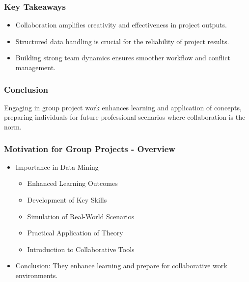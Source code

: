 \documentclass[aspectratio=169]{beamer}
\begin{document}
\begin{frame}[fragile]
    \frametitle{Key Takeaways}
    \begin{itemize}
        \item Collaboration amplifies creativity and effectiveness in project outputs.
        \item Structured data handling is crucial for the reliability of project results.
        \item Building strong team dynamics ensures smoother workflow and conflict management.
    \end{itemize}
\end{frame}

\begin{frame}[fragile]
    \frametitle{Conclusion}
    Engaging in group project work enhances learning and application of concepts, preparing individuals for future professional scenarios where collaboration is the norm.
\end{frame}

\begin{frame}[fragile]
    \frametitle{Motivation for Group Projects - Overview}
    \begin{itemize}
        \item Importance in Data Mining
        \begin{itemize}
            \item Enhanced Learning Outcomes
            \item Development of Key Skills
            \item Simulation of Real-World Scenarios
            \item Practical Application of Theory
            \item Introduction to Collaborative Tools
        \end{itemize}
        \item Conclusion: They enhance learning and prepare for collaborative work environments.
    \end{itemize}
\end{frame}
\end{document}
